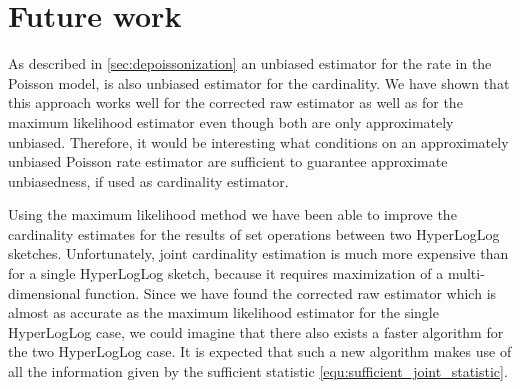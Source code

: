 \documentclass[a4paper]{scrartcl}
\newcommand{\numformat}[1]{{\num[scientific-notation = true,round-mode = places,round-precision = 3, output-exponent-marker = \ensuremath{\mathrm{e}}]{#1}}}
\newcommand{\numformattwo}[1]{{\num[scientific-notation = fixed,round-mode = places,round-precision = 3]{#1}}}
\begin{document}

\section{Future work}
As described in \cref{sec:depoissonization} an unbiased estimator for the rate in the Poisson model, is also unbiased estimator for the cardinality. We have shown that this approach works well for the corrected raw estimator as well as for the maximum likelihood estimator even though both are only approximately unbiased. Therefore, it would be interesting what conditions on an approximately unbiased Poisson rate estimator are sufficient to guarantee approximate unbiasedness, if used as cardinality estimator.

Using the maximum likelihood method we have been able to improve the cardinality estimates for the results of set operations between two HyperLogLog sketches. Unfortunately, joint cardinality estimation is much more expensive than for a single HyperLogLog sketch, because it requires maximization of a multi-dimensional function. Since we have found the corrected raw estimator which is almost as accurate as the maximum likelihood estimator for the single HyperLogLog case, we could imagine that there also exists a faster algorithm for the two HyperLogLog case. It is expected that such a new algorithm makes use of all the information given by the sufficient statistic \eqref{equ:sufficient_joint_statistic}.
\end{document}
